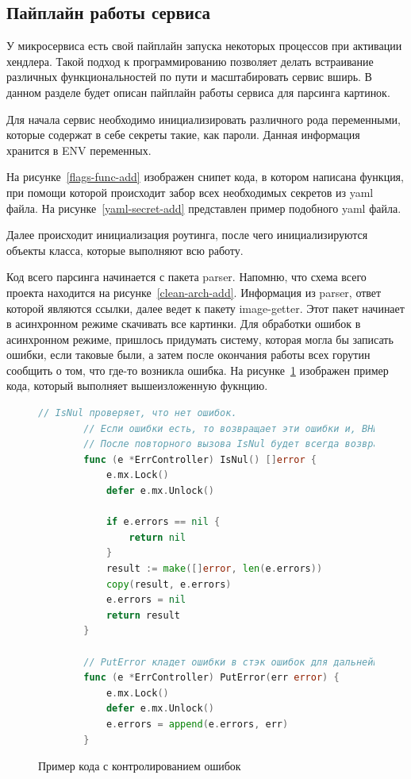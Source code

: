 \subsection{Пайплайн работы сервиса}
У микросервиса есть свой пайплайн запуска некоторых процессов при активации хендлера.
Такой подход к программированию позволяет делать встраивание различных функциональностей по пути и масштабировать сервис вширь.
В данном разделе будет описан пайплайн работы сервиса для парсинга картинок.

Для начала сервис необходимо инициализировать различного рода переменными, которые содержат в себе секреты такие, как пароли.
Данная информация хранится в ENV переменных.

На рисунке~\ref{flags-func-add} изображен снипет кода, в котором написана функция, при помощи которой происходит забор всех необходимых секретов из yaml файла.
На рисунке~\ref{yaml-secret-add} представлен пример подобного yaml файла.

Далее происходит инициализация роутинга, после чего инициализируются объекты класса, которые выполняют всю работу.

Код всего парсинга начинается с пакета parser. Напомню, что схема всего проекта находится на рисунке~\ref{clean-arch-add}.
Информация из parser, ответ которой являются ссылки, далее ведет к пакету image-getter. Этот пакет начинает в асинхронном режиме скачивать все картинки.
Для обработки ошибок в асинхронном режиме, пришлось придумать систему, которая могла бы записать ошибки, если таковые были, а затем после окончания работы всех горутин сообщить о том, что где-то возникла ошибка.
На рисунке~\ref{err-controller-snippet} изображен пример кода, который выполняет вышеизложенную фукнцию.

\begin{figure}
    \begin{lstlisting}[language=go]
        // IsNul проверяет, что нет ошибок.
        // Если ошибки есть, то возвращает эти ошибки и, ВНИМАНИЕ, обнуляет массив ошибок.
        // После повторного вызова IsNul будет всегда возвращаться nil.
        func (e *ErrController) IsNul() []error {
            e.mx.Lock()
            defer e.mx.Unlock()

            if e.errors == nil {
                return nil
            }
            result := make([]error, len(e.errors))
            copy(result, e.errors)
            e.errors = nil
            return result
        }

        // PutError кладет ошибки в стэк ошибок для дальнейшей их обработки
        func (e *ErrController) PutError(err error) {
            e.mx.Lock()
            defer e.mx.Unlock()
            e.errors = append(e.errors, err)
        }
    \end{lstlisting}
    \caption{Пример кода с контролированием ошибок}
    \label{err-controller-snippet}
\end{figure}

